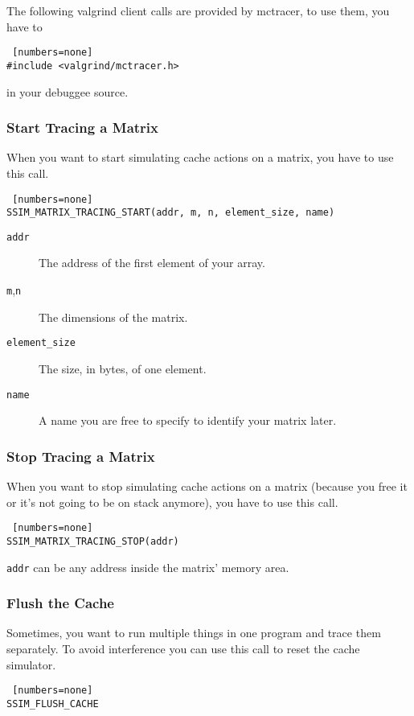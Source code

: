 \lstset{language=C}

The following valgrind client calls are provided by mctracer, to use them, you have to
\begin{lstlisting} [numbers=none]
#include <valgrind/mctracer.h>
\end{lstlisting}
in your debuggee source.

\subsubsection{Start Tracing a Matrix}
When you want to start simulating cache actions on a matrix, you have to use this call.
\begin{lstlisting} [numbers=none]
SSIM_MATRIX_TRACING_START(addr, m, n, element_size, name)
\end{lstlisting}
\begin{description}
\item[\texttt{addr}] The address of the first element of your array.
\item[\texttt{m},\texttt{n}] The dimensions of the matrix.
\item[\texttt{element\_size}] The size, in bytes, of one element.
\item[\texttt{name}] A name you are free to specify to identify your matrix later.
\end{description}


\subsubsection{Stop Tracing a Matrix}
When you want to stop simulating cache actions on a matrix (because you free it or it's not going to be on stack anymore), you have to use this call.
\begin{lstlisting} [numbers=none]
SSIM_MATRIX_TRACING_STOP(addr)
\end{lstlisting}
\texttt{addr} can be any address inside the matrix' memory area.

\subsubsection{Flush the Cache}
Sometimes, you want to run multiple things in one program and trace them separately. To avoid interference you can use this call to reset the cache simulator.
\begin{lstlisting} [numbers=none]
SSIM_FLUSH_CACHE
\end{lstlisting}

